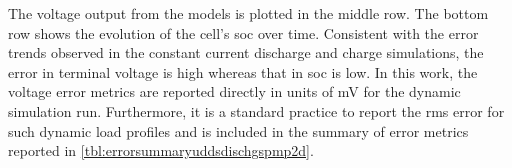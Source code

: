 
The voltage output from the models is  plotted in the middle row. The bottom row
shows  the  evolution  of  the  cell's  \gls{soc}  over  time.  Consistent  with
the  error  trends  observed  in  the  constant  current  discharge  and  charge
simulations, the error in terminal voltage  is high whereas that in \gls{soc} is
low.  In  this  work,  the  voltage  error  metrics  are  reported  directly  in
units  of  \si{\milli\volt} for  the  dynamic  simulation run.  Furthermore,  it
is  a  standard  practice  to  report  the  \gls{rms}  error  for  such  dynamic
load  profiles and  is included  in  the summary  of error  metrics reported  in
\cref{tbl:errorsummaryuddsdischgspmp2d}.





